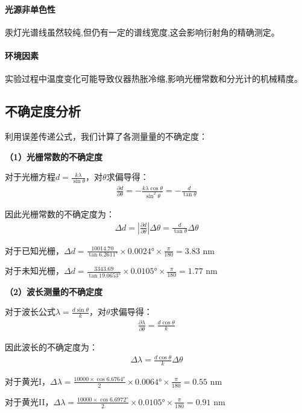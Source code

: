 ﻿\documentclass[12pt,a4paper]{article}
\begin{document}
\paragraph{光源非单色性}汞灯光谱线虽然较纯,但仍有一定的谱线宽度,这会影响衍射角的精确测定。

\paragraph{环境因素}实验过程中温度变化可能导致仪器热胀冷缩,影响光栅常数和分光计的机械精度。

\subsection{不确定度分析}

利用误差传递公式，我们计算了各测量量的不确定度：

\textbf{（1）光栅常数的不确定度}

对于光栅方程$d = \frac{k\lambda}{\sin\theta}$，对$\theta$求偏导得：
\begin{align}
\frac{\partial d}{\partial \theta} = -\frac{k\lambda \cos\theta}{\sin^2\theta} = -\frac{d}{\tan\theta}
\end{align}

因此光栅常数的不确定度为：
\begin{align}
\Delta d = \left|\frac{\partial d}{\partial \theta}\right| \Delta\theta = \frac{d}{\tan\theta} \Delta\theta
\end{align}

对于已知光栅，$\Delta d = \frac{10014.70}{\tan 6.2611°} \times 0.0024° \times \frac{\pi}{180} = 3.83$ nm

对于未知光栅，$\Delta d = \frac{3343.69}{\tan 19.0653°} \times 0.0105° \times \frac{\pi}{180} = 1.77$ nm

\textbf{（2）波长测量的不确定度}

对于波长公式$\lambda = \frac{d\sin\theta}{k}$，对$\theta$求偏导得：
\begin{align}
\frac{\partial \lambda}{\partial \theta} = \frac{d\cos\theta}{k}
\end{align}

因此波长的不确定度为：
\begin{align}
\Delta\lambda = \frac{d\cos\theta}{k} \Delta\theta
\end{align}

对于黄光I，$\Delta\lambda = \frac{10000 \times \cos 6.6764°}{2} \times 0.0064° \times \frac{\pi}{180} = 0.55$ nm

对于黄光II，$\Delta\lambda = \frac{10000 \times \cos 6.6972°}{2} \times 0.0105° \times \frac{\pi}{180} = 0.91$ nm
\end{document}
